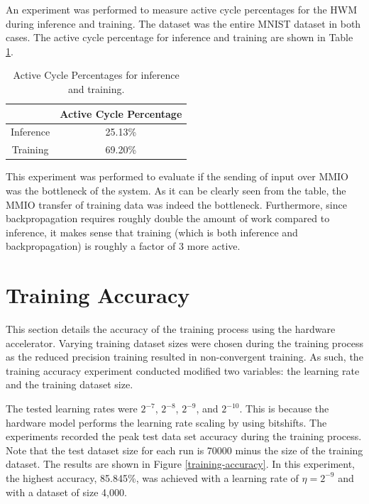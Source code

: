 An experiment was performed to measure active cycle percentages for the HWM during inference and training. The dataset was the entire MNIST dataset in both cases. The active cycle percentage for inference and training are shown in Table \ref{active-cycle-table}.

\begin{table}
	\centering 
	\begin{tabular}{|c|c|}
		\hline
		& \textbf{Active Cycle Percentage} \\\hline
		Inference & 25.13\% \\\hline 
		Training & 69.20\% \\\hline
	\end{tabular}
	\caption{Active Cycle Percentages for inference and training.}
	\label{active-cycle-table}
\end{table}

This experiment was performed to evaluate if the sending of input over MMIO was the bottleneck of the system. As it can be clearly seen from the table, the MMIO transfer of training data was indeed the bottleneck. Furthermore, since backpropagation requires roughly double the amount of work compared to inference, it makes sense that training (which is both inference and backpropagation) is roughly a factor of 3 more active.

\section{Training Accuracy}
This section details the accuracy of the training process using the hardware accelerator. Varying training dataset sizes were chosen during the training process as the reduced precision training resulted in non-convergent training. As such, the training accuracy experiment conducted modified two variables: the learning rate and the training dataset size. 

The tested learning rates were $2^{-7}$, $2^{-8}$, $2^{-9}$, and $2^{-10}$. This is because the hardware model performs the learning rate scaling by using bitshifts. The experiments recorded the peak test data set accuracy during the training process. Note that the test dataset size for each run is 70000 minus the size of the training dataset. The results are shown in Figure \ref{training-accuracy}. In this experiment, the highest accuracy, 85.845\%, was achieved with a learning rate of $\eta = 2^{-9}$ and with a dataset of size 4,000.

